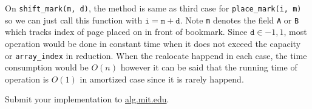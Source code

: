 \documentclass[12pt,twoside]{article}
\begin{document}
\begin{problems}
On \texttt{shift\_mark(m, d)}, the method is same as third case for
\texttt{place\_mark(i, m)} so we can just call this function with
$\texttt{i} = \texttt{m} + \texttt{d}$. Note \texttt{m} denotes the
field \texttt{A} or \texttt{B} which tracks index of page placed on in
front of bookmark. Since $\texttt{d} \in {-1, 1}$, most operation
would be done in constant time when it does not exceed the capacity or
\texttt{array\_index} in reduction. When the realocate happend in each
case, the time consumption would be $O(n)$ however it can be said that
the running time of operation is $O(1)$ in amortized case since it is
rarely happend.



\newpage
\problem  %

\begin{problemparts}
\problempart %
\problempart %
\problempart %
\problempart Submit your implementation to {\small\url{alg.mit.edu}}.
\end{problemparts}

\end{problems}
\end{document}
